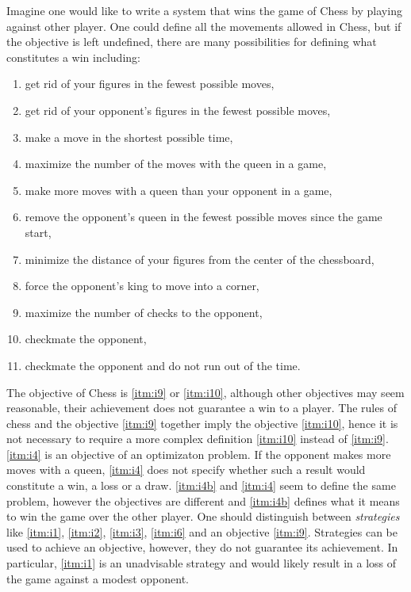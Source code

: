 Imagine one would like to write a system that wins the game of Chess by playing against other player. One could define all the movements allowed in Chess, but if the objective is left undefined, there are many possibilities for defining what constitutes a win including:
\begin{enumerate}
\item\label{itm:i1} get rid of your figures in the fewest possible moves,
\item\label{itm:i2} get rid of your opponent's figures in the fewest possible moves,
\item\label{itm:i3} make a move in the shortest possible time,
\item\label{itm:i4} maximize the number of the moves with the queen in a game,
\item\label{itm:i4b} make more moves with a queen than your opponent in a game,
\item\label{itm:i5} remove the opponent's queen in the fewest possible moves since the game start,
\item\label{itm:i6} minimize the distance of your figures from the center of the chessboard,
\item\label{itm:i7} force the opponent's king to move into a corner,
\item\label{itm:i8} maximize the number of checks to the opponent,
\item\label{itm:i9} checkmate the opponent,
\item\label{itm:i10} checkmate the opponent and do not run out of the time.
\end{enumerate}
The objective of Chess is \ref{itm:i9} or \ref{itm:i10}, although other objectives may seem reasonable, their achievement does not guarantee a win to a player. The rules of chess and the objective \ref{itm:i9} together imply the objective \ref{itm:i10}, hence it is not necessary to require a more complex definition \ref{itm:i10} instead of \ref{itm:i9}. \ref{itm:i4} is an objective of an optimizaton problem. If the opponent makes more moves with a queen, \ref{itm:i4} does not specify whether such a result would constitute a win, a loss or a draw.
\ref{itm:i4b} and \ref{itm:i4} seem to define the same problem, however the objectives are different and \ref{itm:i4b} defines what it means to win the game over the other player.
One should distinguish between \emph{strategies} like \ref{itm:i1}, \ref{itm:i2}, \ref{itm:i3}, \ref{itm:i6} and an objective \ref{itm:i9}. Strategies can be used to achieve an objective, however, they do not guarantee its achievement. In particular, \ref{itm:i1} is an unadvisable strategy and would likely result in a loss of the game against a modest opponent.

